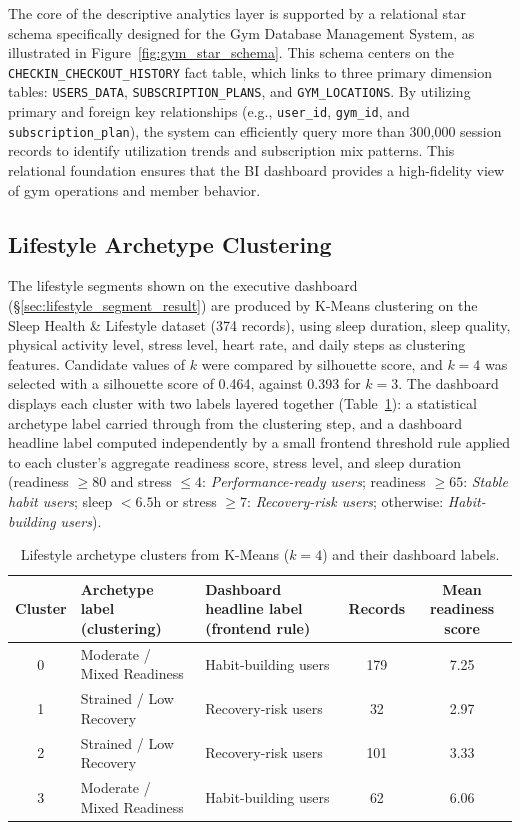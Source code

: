 \documentclass{aitthesis}
\begin{document}
The core of the descriptive analytics layer is supported by a relational star schema specifically designed for the Gym Database Management System, as illustrated in Figure~\ref{fig:gym_star_schema}. This schema centers on the \texttt{CHECKIN\_CHECKOUT\_HISTORY} fact table, which links to three primary dimension tables: \texttt{USERS\_DATA}, \texttt{SUBSCRIPTION\_PLANS}, and \texttt{GYM\_LOCATIONS}. By utilizing primary and foreign key relationships (e.g., \texttt{user\_id}, \texttt{gym\_id}, and \texttt{subscription\_plan}), the system can efficiently query more than 300,000 session records to identify utilization trends and subscription mix patterns. This relational foundation ensures that the BI dashboard provides a high-fidelity view of gym operations and member behavior.

\subsection{Lifestyle Archetype Clustering}

The lifestyle segments shown on the executive dashboard (\S\ref{sec:lifestyle_segment_result}) are produced by K-Means clustering on the Sleep Health \& Lifestyle dataset (374 records), using sleep duration, sleep quality, physical activity level, stress level, heart rate, and daily steps as clustering features. Candidate values of $k$ were compared by silhouette score, and $k=4$ was selected with a silhouette score of 0.464, against 0.393 for $k=3$. The dashboard displays each cluster with two labels layered together (Table~\ref{tab:cluster_profiles}): a statistical archetype label carried through from the clustering step, and a dashboard headline label computed independently by a small frontend threshold rule applied to each cluster's aggregate readiness score, stress level, and sleep duration (readiness $\geq 80$ and stress $\leq 4$: \emph{Performance-ready users}; readiness $\geq 65$: \emph{Stable habit users}; sleep $<6.5$h or stress $\geq 7$: \emph{Recovery-risk users}; otherwise: \emph{Habit-building users}).

\begin{table}[H]
\centering
\small
\caption{Lifestyle archetype clusters from K-Means ($k=4$) and their dashboard labels.}
\label{tab:cluster_profiles}
\begin{tabularx}{\linewidth}{cXXcc}
\toprule
\textbf{Cluster} & \textbf{Archetype label (clustering)} & \textbf{Dashboard headline label (frontend rule)} & \textbf{Records} & \textbf{Mean readiness score} \\
\midrule
0 & Moderate / Mixed Readiness & Habit-building users & 179 & 7.25 \\
1 & Strained / Low Recovery & Recovery-risk users & 32 & 2.97 \\
2 & Strained / Low Recovery & Recovery-risk users & 101 & 3.33 \\
3 & Moderate / Mixed Readiness & Habit-building users & 62 & 6.06 \\
\bottomrule
\end{tabularx}
\end{table}
\end{document}
